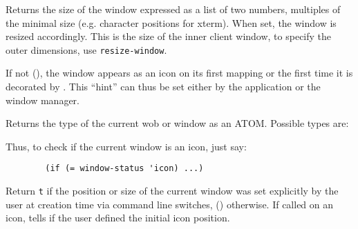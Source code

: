 
Returns the size of the window expressed as a list of two numbers,
multiples of the minimal size (e.g. character positions for xterm).  When
set, the window is resized accordingly. This is the size of the inner
client window, to specify the outer dimensions, use \verb"resize-window".

        

If not (), the window appears as an icon on its first mapping or the
first time it is decorated by {\GWM}. This ``hint'' can thus be set either
by the application or the window manager.

        

Returns the type of the current wob or window as an ATOM. Possible types
are:


Thus, to check if the current window is an icon, just say:
{\exemplefont\begin{verbatim} 
        (if (= window-status 'icon) ...)
\end{verbatim}}

        

Return \verb"t" if the position or size of the current window was set
explicitly by the user at creation time via command line switches, ()
otherwise. If called on an icon, tells if the user defined the initial icon
position.

        
